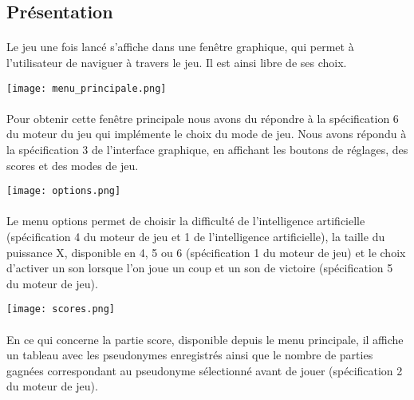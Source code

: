 \documentclass[a4paper,oneside]{article}
\begin{document}
\subsection{Présentation }

\paragraph{}
Le jeu une fois lancé s'affiche dans une fenêtre graphique, qui permet à l'utilisateur de naviguer à travers le jeu. Il est ainsi libre de ses choix.

\begin{center}
\texttt{[image: menu\_principale.png]}
\end{center}

\paragraph{}
Pour obtenir cette fenêtre principale nous avons du répondre à la spécification 6 du moteur du jeu qui implémente le choix du mode de jeu. 
Nous avons répondu à la spécification 3 de l'interface graphique, en affichant les boutons de réglages, des scores et des modes de jeu.


\begin{center}
\texttt{[image: options.png]}
\end{center}

\paragraph{}
Le menu options permet de choisir la difficulté de l'intelligence artificielle (spécification 4 du moteur de jeu et 1 de l'intelligence artificielle), la taille du puissance X, disponible en 4, 5 ou 6 (spécification 1 du moteur de jeu) et le choix d'activer un son lorsque l'on joue un coup et un son de victoire (spécification 5 du moteur de jeu).
\vspace{2cm}

\begin{center}
	\texttt{[image: scores.png]}
\end{center}

\paragraph{}
En ce qui concerne la partie score, disponible depuis le menu principale, il affiche un tableau avec les pseudonymes enregistrés ainsi que le nombre de parties gagnées correspondant au pseudonyme sélectionné avant de jouer (spécification 2 du moteur de jeu).
\end{document}

